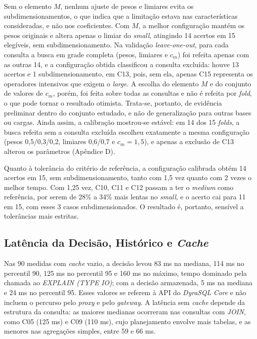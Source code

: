 Sem o elemento $M$, nenhum ajuste de pesos e limiares evita os subdimensionamentos, o que indica que a limitação estava nas características consideradas, e não nos coeficientes. Com $M$, a melhor configuração mantém os pesos originais e altera apenas o limiar do \textit{small}, atingindo 14 acertos em 15 elegíveis, sem subdimensionamento. Na validação \textit{leave-one-out}, para cada consulta a busca em grade completa (pesos, limiares e $c_m$) foi refeita apenas com as outras 14, e a configuração obtida classificou a consulta excluída: houve 13 acertos e 1 subdimensionamento, em C13, pois, sem ela, apenas C15 representa os operadores intensivos que exigem o \textit{large}. A escolha do elemento $M$ e do conjunto de valores de $c_m$, porém, foi feita sobre todas as consultas e não é refeita por \textit{fold}, o que pode tornar o resultado otimista. Trata-se, portanto, de evidência preliminar dentro do conjunto estudado, e não de generalização para outras bases ou cargas. Ainda assim, a calibração mostrou-se estável: em 14 dos 15 \textit{folds}, a busca refeita sem a consulta excluída escolheu exatamente a mesma configuração (pesos 0,5/0,3/0,2, limiares 0,6/0,7 e $c_m = 1,5$), e apenas a exclusão de C13 alterou os parâmetros (Apêndice D).

Quanto à tolerância do critério de referência, a configuração calibrada obtém 14 acertos em 15, sem subdimensionamento, tanto com 1,5 vez quanto com 2 vezes o melhor tempo. Com 1,25 vez, C10, C11 e C12 passam a ter o \textit{medium} como referência, por serem de 28\% a 34\% mais lentas no \textit{small}, e o acerto cai para 11 em 15, com esses 3 casos subdimensionados. O resultado é, portanto, sensível a tolerâncias mais estritas.

\subsection{Latência da Decisão, Histórico e \textit{Cache}}

Nas 90 medidas com \textit{cache} vazio, a decisão levou 83 ms na mediana, 114 ms no percentil 90, 125 ms no percentil 95 e 160 ms no máximo, tempo dominado pela chamada ao \textit{EXPLAIN (TYPE IO)}; com a decisão armazenada, 5 ms na mediana e 24 ms no percentil 95. Esses valores se referem à API do \textit{DyraSQL Core} e não incluem o percurso pelo \textit{proxy} e pelo \textit{gateway}. A latência sem \textit{cache} depende da estrutura da consulta: as maiores medianas ocorreram nas consultas com \textit{JOIN}, como C05 (125 ms) e C09 (110 ms), cujo planejamento envolve mais tabelas, e as menores nas agregações simples, entre 59 e 66 ms.

